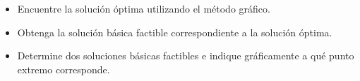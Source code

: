 \documentclass[letterpaper]{article}
\begin{document}
\begin{itemize}
\item Encuentre la solución óptima utilizando el método gráfico.
\item Obtenga la solución básica factible correspondiente a la solución óptima.
\item Determine dos soluciones básicas factibles e indique gráficamente a qué punto extremo corresponde.
\end{itemize}
\end{document}
